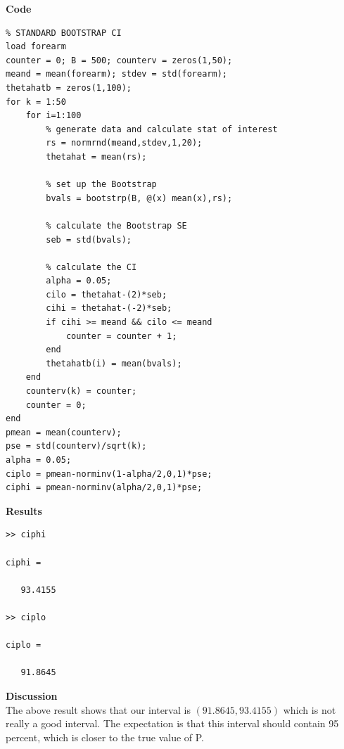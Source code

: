 \documentclass[12pt,a4paper]{article}
\begin{document}
\textbf{Code}\\
\begin{verbatim}
% STANDARD BOOTSTRAP CI
load forearm
counter = 0; B = 500; counterv = zeros(1,50);
meand = mean(forearm); stdev = std(forearm);
thetahatb = zeros(1,100);
for k = 1:50
    for i=1:100
        % generate data and calculate stat of interest
        rs = normrnd(meand,stdev,1,20);
        thetahat = mean(rs);
        
        % set up the Bootstrap
        bvals = bootstrp(B, @(x) mean(x),rs);
        
        % calculate the Bootstrap SE
        seb = std(bvals);
        
        % calculate the CI
        alpha = 0.05;
        cilo = thetahat-(2)*seb;
        cihi = thetahat-(-2)*seb;
        if cihi >= meand && cilo <= meand
            counter = counter + 1;
        end
        thetahatb(i) = mean(bvals);
    end
    counterv(k) = counter;
    counter = 0;
end
pmean = mean(counterv);
pse = std(counterv)/sqrt(k);
alpha = 0.05;
ciplo = pmean-norminv(1-alpha/2,0,1)*pse;
ciphi = pmean-norminv(alpha/2,0,1)*pse;
\end{verbatim}

\textbf{Results}\

\begin{verbatim}
>> ciphi

ciphi =

   93.4155

>> ciplo

ciplo =

   91.8645
\end{verbatim}

\textbf{Discussion}\\
The above result shows that our interval is $(91.8645, 93.4155)$ which is not really a good interval. The expectation is that this interval should contain 95 percent, which is closer to the true value of P.
\end{document}
